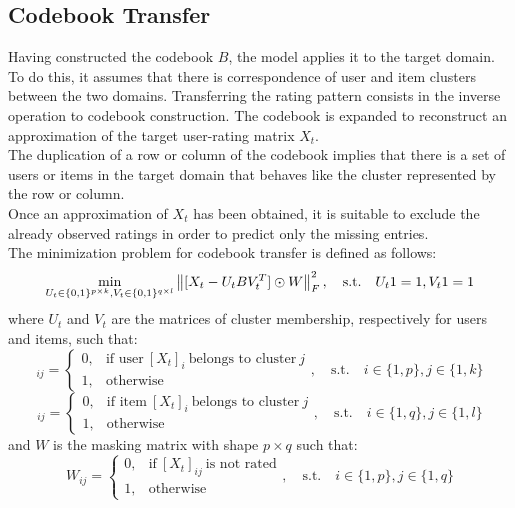 \subsection{Codebook Transfer}

Having constructed the codebook $B$, the model applies it to the target domain. To do this, it assumes that there is correspondence of user and item clusters between the two domains. Transferring the rating pattern consists in the inverse operation to codebook construction. The codebook is expanded to reconstruct an approximation of the target user-rating matrix $X_t$.\\
The duplication of a row or column of the codebook implies that there is a set of users or items in the target domain that behaves like the cluster represented by the row or column.\\
Once an approximation of $X_t$ has been obtained, it is suitable to exclude the already observed ratings in order to predict only the missing entries.\\
The minimization problem for codebook transfer is defined as follows:
\begin{equation}
\min_{U_t \in \{0,1\}^{p \times k}, V_t \in \{0,1\}^{q \times l}} \left\lVert[X_t - U_t B V_t^T] \odot W\right\rVert^2_F, \quad \text{s.t.} \quad U_t 1 = 1, V_t 1 = 1
\end{equation}
where $U_t$ and $V_t$ are the matrices of cluster membership, respectively for users and items, such that:
\begin{equation}
  [U_t]_{ij} =
  \begin{cases}
    0, & \text{if user}\ [X_t]_{i}\ \text{belongs to cluster}\ j\\
    1, & \text{otherwise}
  \end{cases}
  , \quad \text{s.t.} \quad i \in \{1,p\}, j \in \{1,k\}
\end{equation}
\begin{equation}
  [V_t]_{ij} =
  \begin{cases}
    0, & \text{if item}\ [X_t]_{i}\ \text{belongs to cluster}\ j\\
    1, & \text{otherwise}
  \end{cases}
  , \quad \text{s.t.} \quad i \in \{1,q\}, j \in \{1,l\}
\end{equation}
and $W$ is the masking matrix with shape $p \times q$ such that:
\begin{equation}
  W_{ij} =
  \begin{cases}
    0, & \text{if}\ [X_t]_{ij}\ \text{is not rated}\\
    1, & \text{otherwise}
  \end{cases}
  , \quad \text{s.t.} \quad i \in \{1,p\}, j \in \{1,q\}
\end{equation}

